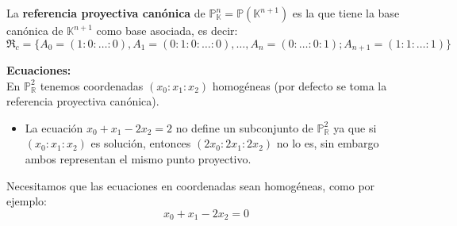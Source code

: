 
\begin{definición} 
    La \textbf{referencia proyectiva canónica} de $\mathbb{P}^n_{\mathbb{K}} = \mathbb{P}(\mathbb{K}^{n+1})$ es la que tiene la base canónica de $\mathbb{K}^{n+1}$ como base asociada, es decir:
    \[
        \mathfrak{R}_{c} = \{A_0=(1:0:\ldots:0), A_1=(0:1:0:\ldots:0), \ldots, A_n=(0:\ldots:0:1); A_{n+1}=(1:1:\ldots:1)\}
    \]
\end{definición}

\textbf{Ecuaciones:}\\
En $\mathbb{P}^2_{\mathbb{R}}$ tenemos coordenadas $(x_0 : x_1 : x_2)$ homogéneas (por defecto se toma la referencia proyectiva canónica).

\begin{itemize}
    \item La ecuación $x_0 + x_1 - 2x_2 = 2$ no define un subconjunto de $\mathbb{P}^2_{\mathbb{R}}$ ya que si $(x_0 : x_1 : x_2)$ es solución, entonces $(2x_0 : 2x_1 : 2x_2)$ no lo es, sin embargo ambos representan el mismo punto proyectivo.
\end{itemize}

Necesitamos que las ecuaciones en coordenadas sean homogéneas, como por ejemplo:
\[
    x_0 + x_1 - 2x_2 = 0
\]

